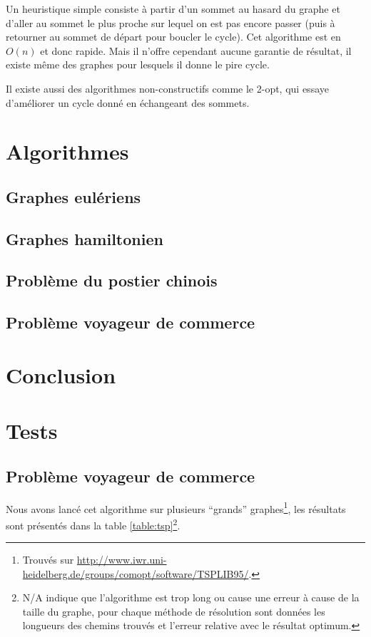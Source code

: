 \documentclass{scrartcl}
\begin{document}
    Un heuristique simple consiste à partir d'un sommet au hasard du graphe et
    d'aller au sommet le plus proche sur lequel on est pas encore passer (puis
    à retourner au sommet de départ pour boucler le cycle). Cet algorithme est
    en $O(n)$ et donc rapide. Mais il n'offre cependant aucune garantie de
    résultat, il existe même des graphes pour lesquels il donne le pire cycle.

    Il existe aussi des algorithmes non-constructifs comme le 2-opt, qui essaye
    d'améliorer un cycle donné en échangeant des sommets.


\section{Algorithmes}
  \subsection{Graphes eulériens}
  \subsection{Graphes hamiltonien}
  \subsection{Problème du postier chinois}
  \subsection{Problème voyageur de commerce}
  
\section{Conclusion}

\section{Tests}
\subsection{Problème voyageur de commerce}
    Nous avons lancé cet algorithme sur plusieurs ``grands''
    graphes\footnote{Trouvés sur
      \url{http://www.iwr.uni-heidelberg.de/groups/comopt/software/TSPLIB95/}.
    }, les résultats sont présentés dans la table \ref{table:tsp}\footnote{N/A
    indique que l'algorithme est trop long ou cause une erreur à cause de la
    taille du graphe, pour chaque méthode de résolution sont données les
    longueurs des chemins trouvés et l'erreur relative avec le résultat
    optimum.}.
\end{document}
